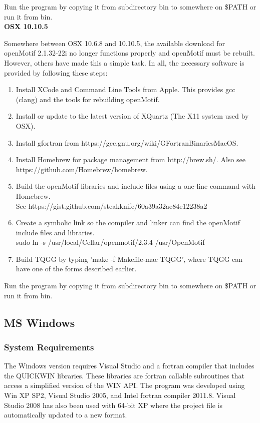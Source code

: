 \documentclass{article}
\begin{document}
Run the program by copying it from subdirectory bin to somewhere on \$PATH or run it from bin. \\

{\bf{OSX 10.10.5}}

Somewhere between OSX 10.6.8 and 10.10.5, the available download for openMotif 2.1.32-22i no longer 
functions properly and openMotif must be rebuilt. However, others have made this a simple task.
In all, the necessary software is provided by following these steps:
\begin{enumerate}
 \item Install XCode and Command Line Tools from Apple. This provides gcc (clang) and the tools
 for rebuilding openMotif.
 \item Install or update to the latest version of XQuartz (The X11 system used by OSX). 
 \item Install gfortran from https://gcc.gnu.org/wiki/GFortranBinariesMacOS.
 \item Install Homebrew for package management from http://brew.sh/. Also see https://github.com/Homebrew/homebrew.
 \item Build the openMotif libraries and include files using a one-line command with Homebrew.\\ 
 See https://gist.github.com/steakknife/60a39a32ae84e12238a2
 \item Create a symbolic link so the compiler and linker can find the openMotif include files and libraries.\\
 sudo ln -s /usr/local/Cellar/openmotif/2.3.4 /usr/OpenMotif
 \item Build TQGG by typing 'make -f Makefile-mac TQGG', where TQGG can have one of the forms described earlier.
\end{enumerate}

Run the program by copying it from subdirectory bin to somewhere on \$PATH or run it from bin. 

\subsection{MS Windows}
\subsubsection{System Requirements}
The Windows version requires Visual Studio and a fortran compiler that includes the QUICKWIN
libraries. These libraries are fortran callable subroutines that access a simplified version
of the WIN API. The program was developed using Win XP SP2, Visual Studio 2005, and Intel fortran
compiler 2011.8. Visual Studio 2008 has also been used with 64-bit XP where the project file is
automatically updated to a new format.
\end{document}
